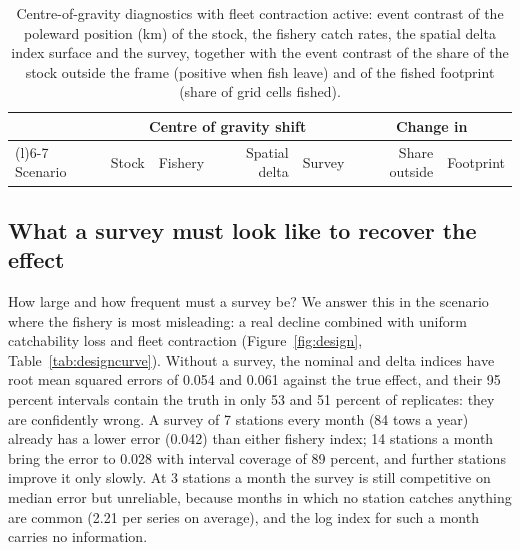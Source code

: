 \documentclass[11pt,a4paper]{article}
\begin{document}
\begin{table}[tbp]
\centering\footnotesize
\caption{Centre-of-gravity diagnostics with fleet contraction active: event contrast of the poleward position (km) of the stock, the fishery catch rates, the spatial delta index surface and the survey, together with the event contrast of the share of the stock outside the frame (positive when fish leave) and of the fished footprint (share of grid cells fished).}
\label{tab:cog}
\begin{tabular}{@{}>{\raggedright\arraybackslash}p{3.6cm}rrrrrr@{}}
\toprule
 & \multicolumn{4}{c}{Centre of gravity shift} & \multicolumn{2}{c}{Change in} \\
\cmidrule(lr){2-5}\cmidrule(l){6-7}
Scenario & Stock & Fishery & Spatial delta & Survey & Share outside & Footprint \\
\midrule
\bottomrule
\end{tabular}
\end{table}

\subsection{What a survey must look like to recover the effect}
\label{sec:res-survey}

How large and how frequent must a survey be? We answer this in the scenario where the fishery is most misleading: a real decline combined with uniform catchability loss and fleet contraction (Figure~\ref{fig:design}, Table~\ref{tab:designcurve}). Without a survey, the nominal and delta indices have root mean squared errors of 0.054 and 0.061 against the true effect, and their 95 percent intervals contain the truth in only 53 and 51 percent of replicates: they are confidently wrong. A survey of 7 stations every month (84 tows a year) already has a lower error (0.042) than either fishery index; 14 stations a month bring the error to 0.028 with interval coverage of 89 percent, and further stations improve it only slowly. At 3 stations a month the survey is still competitive on median error but unreliable, because months in which no station catches anything are common (2.21 per series on average), and the log index for such a month carries no information.
\end{document}
